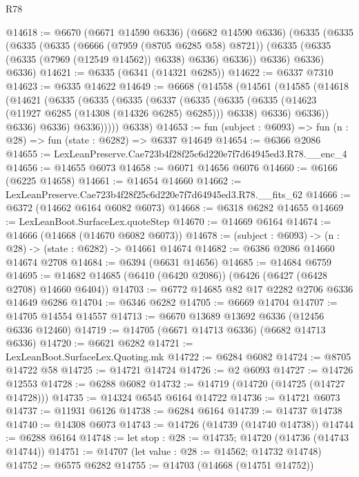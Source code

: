 \begin{lexlean}{R78}
\begin{coremodule}
@14618 := @6670
    (@6671 @14590 @6336)
    (@6682 @14590 @6336)
    (@6335
      (@6335
        (@6335
          (@6335
            (@6666 (@7959 (@8705 @6285 @58) @8721))
            (@6335 (@6335 (@6335 (@7969 (@12549 @14562)) @6338) @6336) @6336))
          @6336)
        @6336)
      @6336)
@14621 := @6335 (@6341 (@14321 @6285))
@14622 := @6337 @7310
@14623 := @6335 @14622
@14649 := @6668
    (@14558
      (@14561
        (@14585
          (@14618
            (@14621
              (@6335
                (@6335
                  (@6335
                    (@6337
                      (@6335
                        (@6335
                          (@6335 (@14623 (@11927 @6285 (@14308 (@14326 @6285) @6285))) @6338)
                          @6336)
                        @6336))
                    @6336)
                  @6336)
                @6336)))))
      @6338)
@14653 := fun (subject : @6093) => fun (n : @28) => fun (state : @6282) => @6337 @14649
@14654 := @6366 @2086
@14655 := LexLeanPreserve.Cae723b4f28f25c6d220e7f7d64945ed3.R78.__enc_4
@14656 := @14655 @6073
@14658 := @6071 @14656 @6076
@14660 := @6166 (@6225 @14658)
@14661 := @14654 @14660
@14662 := LexLeanPreserve.Cae723b4f28f25c6d220e7f7d64945ed3.R78.__fits_62
@14666 := @6372 (@14662 @6164 @6082 @6073)
@14668 := @6318 @6282 @14655
@14669 := LexLeanBoot.SurfaceLex.quoteStep
@14670 := @14669 @6164
@14674 := @14666 (@14668 (@14670 @6082 @6073))
@14678 := (subject : @6093) -> (n : @28) -> (state : @6282) -> @14661 @14674
@14682 := @6386 @2086 @14660 @14674 @2708
@14684 := @6394 (@6631 @14656)
@14685 := @14684 @6759
@14695 := @14682 @14685 (@6410 (@6420 @2086)) (@6426 (@6427 (@6428 @2708) @14660 @6404))
@14703 := @6772 @14685 @82 @17 @2282 @2706 @6336 @14649 @6286
@14704 := @6346 @6282
@14705 := @6669 @14704
@14707 := @14705 @14554 @14557
@14713 := @6670 @13689 @13692 @6336 (@12456 @6336 @12460)
@14719 := @14705 (@6671 @14713 @6336) (@6682 @14713 @6336)
@14720 := @6621 @6282
@14721 := LexLeanBoot.SurfaceLex.Quoting.mk
@14722 := @6284 @6082
@14724 := @8705 @14722 @58
@14725 := @14721 @14724
@14726 := @2 @6093
@14727 := @14726 @12553
@14728 := @6288 @6082
@14732 := @14719 (@14720 (@14725 (@14727 @14728)))
@14735 := @14324 @6545 @6164 @14722
@14736 := @14721 @6073
@14737 := @11931 @6126
@14738 := @6284 @6164
@14739 := @14737 @14738
@14740 := @14308 @6073
@14743 := @14726 (@14739 (@14740 @14738))
@14744 := @6288 @6164
@14748 := let stop : @28 := @14735; @14720 (@14736 (@14743 @14744))
@14751 := @14707 (let value : @28 := @14562; @14732 @14748)
@14752 := @6575 @6282
@14755 := @14703 (@14668 (@14751 @14752))

\end{coremodule}
\end{lexlean}
